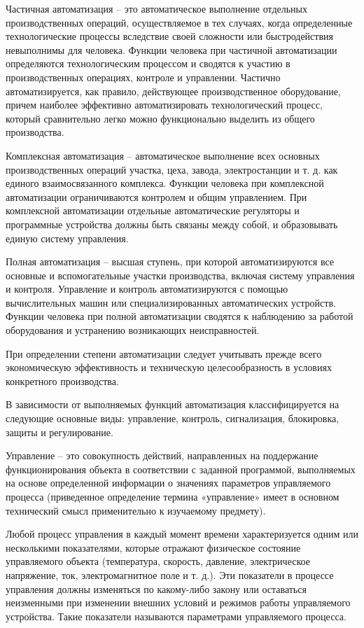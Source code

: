 Частичная автоматизация -- это автоматическое выполнение отдельных производственных операций, осуществляемое в тех случаях, когда определенные технологические процессы вследствие своей сложности или быстродействия невыполнимы для человека. Функции человека при частичной автоматизации определяются технологическим процессом и сводятся к участию в производственных операциях, контроле и управлении. Частично автоматизируется, как правило, действующее производственное оборудование, причем наиболее эффективно автоматизировать технологический процесс, который сравнительно легко можно функционально выделить из общего производства.

Комплексная автоматизация -- автоматическое выполнение всех основных производственных операций участка, цеха, завода, электростанции и т. д. как единого взаимосвязанного комплекса. Функции человека при комплексной автоматизации ограничиваются контролем и общим управлением. При комплексной автоматизации отдельные автоматические регуляторы и программные устройства должны быть связаны между собой, и образовывать единую систему управления.

Полная автоматизация -- высшая ступень, при которой автоматизируются все основные и вспомогательные участки производства, включая систему управления и контроля. Управление и контроль автоматизируются с помощью вычислительных машин или специализированных автоматических устройств. Функции человека при полной автоматизации сводятся к наблюдению за работой оборудования и устранению возникающих неисправностей.

При определении степени автоматизации следует учитывать прежде всего экономическую эффективность и техническую целесообразность в условиях конкретного производства.

В зависимости от выполняемых функций автоматизация классифицируется на следующие основные виды: управление, контроль, сигнализация, блокировка, защиты и регулирование.

Управление -- это совокупность действий, направленных на поддержание функционирования объекта в соответствии с заданной программой, выполняемых на основе определенной информации о значениях параметров управляемого процесса (приведенное определение термина «управление» имеет в основном технический смысл применительно к изучаемому предмету).

Любой процесс управления в каждый момент времени характеризуется одним или несколькими показателями, которые отражают физическое состояние управляемого объекта (температура, скорость, давление, электрическое напряжение, ток, электромагнитное поле и т. д.). Эти показатели в процессе управления должны изменяться по какому-либо закону или оставаться неизменными при изменении внешних условий и режимов работы управляемого устройства. Такие показатели называются параметрами управляемого процесса.

